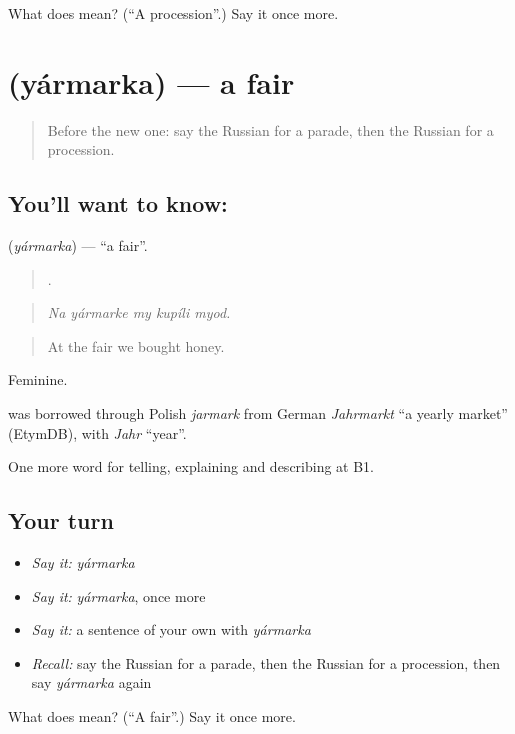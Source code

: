 \begin{tcolorbox}[breakable,colback=teal!4,colframe=teal!35!black,title={Before you move on}]
What does  mean? (\textquotedblleft{}A procession\textquotedblright{}.) Say it once more.
\end{tcolorbox}
\section[\texorpdfstring{\ru{ярмарка} (yármarka)}{ярмарка (yármarka)}]{ (yármarka) — a fair}

\label{lesson:RU-C316-yarmarka}



\begin{quote}
Before the new one: say the Russian for a parade, then the Russian for a procession.
\end{quote}

\subsection*{You'll want to know: }
\textbf{} (\emph{yármarka}) — \textquotedblleft{}a fair\textquotedblright{}.

\begin{quote}
    .
\end{quote}

\begin{quote}
\emph{Na yármarke my kupíli myod.}
\end{quote}

\begin{quote}
At the fair we bought honey.
\end{quote}

Feminine.

\begin{cousinweb}
\emph{} was borrowed through Polish \emph{jarmark} from German \emph{Jahrmarkt} \textquotedblleft{}a yearly market\textquotedblright{} (EtymDB), with \emph{Jahr} \textquotedblleft{}year\textquotedblright{}.
\end{cousinweb}

\begin{grammarlens}[title={What you've built}]
One more word for telling, explaining and describing at B1.
\end{grammarlens}

\subsection*{Your turn}
\begin{itemize}
\raggedright
  \item \emph{Say it:} \emph{yármarka}
  \item \emph{Say it:} \emph{yármarka}, once more
  \item \emph{Say it:} a sentence of your own with \emph{yármarka}
  \item \emph{Recall:} say the Russian for a parade, then the Russian for a procession, then say \emph{yármarka} again
\end{itemize}

\begin{tcolorbox}[breakable,colback=teal!4,colframe=teal!35!black,title={Before you move on}]
What does  mean? (\textquotedblleft{}A fair\textquotedblright{}.) Say it once more.
\end{tcolorbox}

